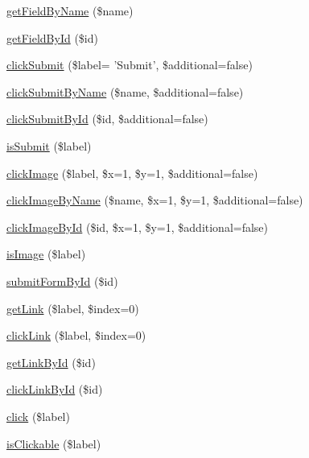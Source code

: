 \begin{DoxyCompactItemize}
\hyperlink{class_simple_browser_af5369e4063b02b0925f2c49913029085}{getFieldByName} (\$name)
\item 
\hyperlink{class_simple_browser_a77372832bd9b64449e958f3af30d4989}{getFieldById} (\$id)
\item 
\hyperlink{class_simple_browser_a4b9828b2ffd9a094c61475c355205530}{clickSubmit} (\$label= 'Submit', \$additional=false)
\item 
\hyperlink{class_simple_browser_a0cd6ae8dcdcd8239a7823759549bb494}{clickSubmitByName} (\$name, \$additional=false)
\item 
\hyperlink{class_simple_browser_a76bd5346e06f7102a25709c704f85a5c}{clickSubmitById} (\$id, \$additional=false)
\item 
\hyperlink{class_simple_browser_ab4e7dee19771dcfb1a2ad260bbc0dbdf}{isSubmit} (\$label)
\item 
\hyperlink{class_simple_browser_a03c5895361643a7b1e9a976e7c2fad2b}{clickImage} (\$label, \$x=1, \$y=1, \$additional=false)
\item 
\hyperlink{class_simple_browser_ad65bf114e79f0cdbcfab9f995ff4b5dd}{clickImageByName} (\$name, \$x=1, \$y=1, \$additional=false)
\item 
\hyperlink{class_simple_browser_a0750dd5719a6bcc3e6bcbb7f52fbc92b}{clickImageById} (\$id, \$x=1, \$y=1, \$additional=false)
\item 
\hyperlink{class_simple_browser_a38d002eebc7a6a822ee26e0fb9b6e1cd}{isImage} (\$label)
\item 
\hyperlink{class_simple_browser_a26f0d417c5ebdc85111f076b2e451f07}{submitFormById} (\$id)
\item 
\hyperlink{class_simple_browser_aa470970ab516973d824e0cc2486f615f}{getLink} (\$label, \$index=0)
\item 
\hyperlink{class_simple_browser_a133bb64ab68f9d973f30be9de9d7120a}{clickLink} (\$label, \$index=0)
\item 
\hyperlink{class_simple_browser_a1992ecd8ed0630eab26076c6e501910a}{getLinkById} (\$id)
\item 
\hyperlink{class_simple_browser_a4b01802bf87bf267226f41e55a02937f}{clickLinkById} (\$id)
\item 
\hyperlink{class_simple_browser_a8d4514b3ad63fb04756ba0dccf3cbd78}{click} (\$label)
\item 
\hyperlink{class_simple_browser_adeb08f275213540419d48f9cad4aeda7}{isClickable} (\$label)
\end{DoxyCompactItemize}

